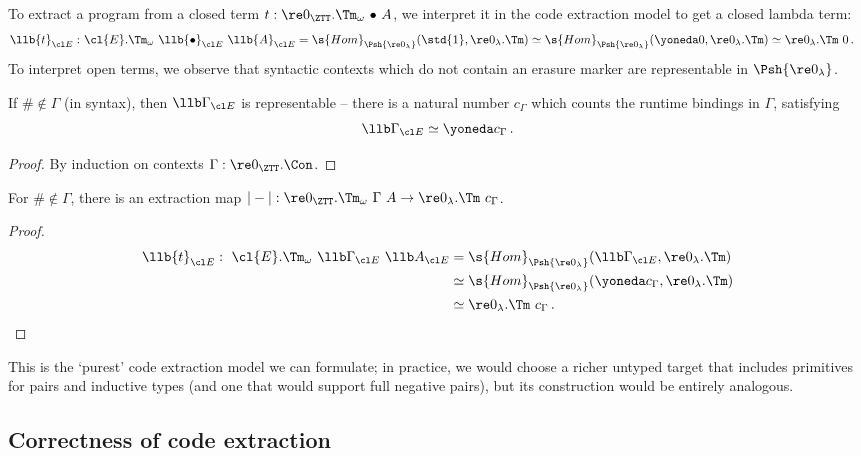 To extract a program from a closed \ZTT term $t : \re 0_{\ZTT}.\Tm_\omega\ {\bullet}\ A$,
we interpret it in the code extraction model to get a closed lambda term:
\[\begin{aligned}
  \llb{t}_{\cl E} :&\ \cl{E}.\Tm_{\omega}\ \llb{\bullet}_{\cl E}\ \llb{A}_{\cl E}
    = \s{Hom}_{\Psh {\re 0_\lambda}}(\std{1}, {\re 0_\lambda}.\Tm)
    \simeq \s{Hom}_{\Psh {\re 0_\lambda}}(\yoneda 0, {\re 0_\lambda}.\Tm)
    \simeq \re 0_\lambda.\Tm\ 0 \,.
\end{aligned}\]
To interpret open terms, we observe that syntactic contexts which do not contain an
erasure marker are representable in $\Psh{\re 0_\lambda}$.
\begin{lemma}
  If $\# \not\in \Gamma$ (in \ZTT syntax), then $\llb\Gamma_{\cl E}$
  is representable -- there is a natural number $c_\Gamma$ which
  counts the runtime bindings in $\Gamma$, satisfying
  \[
    \llb\Gamma_{\cl E} \simeq \yoneda c_\Gamma \,.
  \]
  \begin{proof}
    By induction on contexts $\Gamma : \re 0_{\ZTT}.\Con$.
  \end{proof}
\end{lemma}
\begin{corollary}
  For $\# \not\in \Gamma$, there is an extraction map $|-| : \re 0_{\ZTT}.\Tm_\omega\ \Gamma\ A 
   \to \re 0_{\lambda}.\Tm\ c_\Gamma$.
  \begin{proof}
  \[\begin{aligned}
    \llb{t}_{\cl E} :\ \cl{E}.\Tm_{\omega}\ \llb\Gamma_{\cl E}\ \llb A_{\cl E}
      &= \s{Hom}_{\Psh{\re 0_\lambda}}(\llb\Gamma_{\cl E}, {\re 0_\lambda}.\Tm) \\
      &\simeq \s{Hom}_{\Psh{\re 0_\lambda}}(\yoneda c_\Gamma, {\re 0_\lambda}.\Tm) \\
      &\simeq {\re 0_\lambda}.\Tm\ c_\Gamma \,.
  \end{aligned}\]
  \end{proof}
\end{corollary}

This is the `purest' code extraction model we can formulate; in practice, we
would choose a richer untyped target that includes primitives for pairs and
inductive types (and one that would support full negative pairs), but its construction
would be entirely analogous.

\subsection{Correctness of code extraction}\label{sub:code-extr-corr}

